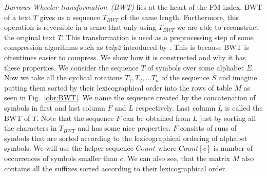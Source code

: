 \textit{Burrows-Wheeler transformation~(BWT)} lies at the heart of the FM-index.
BWT of a text $T$ gives us a sequence $T_{BWT}$ of the same length. Furthermore, this
operation is reversible in a sense that only using $T_{BWT}$ we are able to reconstruct the
original text $T$. This transformation is used as a preprocessing step of some compression
algorithms such as \textit{bzip2} introduced by \cite{seward1996bzip2}. This is because
BWT is oftentimes easier to compress. We show how it is constructed and why it has
these properties. We consider the sequence $T$ of symbols over some alphabet $\Sigma$.
Now we take all the cyclical rotations $T_1, T_2, \ldots T_n$ of the sequence $S$ and
imagine putting them sorted by their lexicographical order into the rows of table $M$
as seen in Fig.~\ref{obr:BWT}. We name the sequence created by the concatenation of symbols
in first and last column $F$ and $L$ respectively. Last column $L$ is called the BWT
of $T$. Note that the sequence $F$ can be obtained from $L$ just by sorting all the
characters in $T_{BWT}$ and has some nice properties. $F$ consists of runs of symbols
that are sorted according to the lexicographical ordering of alphabet symbols. We will
use the helper sequence $Count$ where $Count[c]$ is number of occurrences of symbols
smaller than $c$. We can also see, that the matrix $M$ also contains all the suffixes
sorted according to their lexicographical order. 

